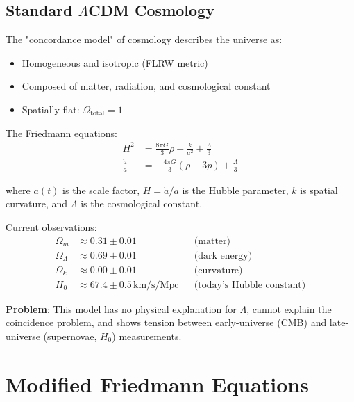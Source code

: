 \subsection{Standard \texorpdfstring{$\Lambda$}{Lambda}CDM Cosmology}

\begin{level2}
The "concordance model" of cosmology\cite{peebles2003,planck2018} describes the universe as:
\begin{itemize}
\item Homogeneous and isotropic (FLRW metric)
\item Composed of matter, radiation, and cosmological constant
\item Spatially flat: $\Omega_{\text{total}} = 1$
\end{itemize}

The Friedmann equations\cite{friedmann1922,lemaitre1927,robertson1935}:
\begin{align}
H^2 &= \frac{8\pi G}{3} \rho - \frac{k}{a^2} + \frac{\Lambda}{3} \label{eq:friedmann1-standard} \\
\frac{\ddot{a}}{a} &= -\frac{4\pi G}{3} (\rho + 3p) + \frac{\Lambda}{3} \label{eq:friedmann2-standard}
\end{align}

where $a(t)$ is the scale factor, $H = \dot{a}/a$ is the Hubble parameter, $k$ is spatial curvature, and $\Lambda$ is the cosmological constant.

Current observations\cite{planck2018}:
\begin{align}
\Omega_m &\approx 0.31 \pm 0.01 && \text{(matter)} \\
\Omega_\Lambda &\approx 0.69 \pm 0.01 && \text{(dark energy)} \\
\Omega_k &\approx 0.00 \pm 0.01 && \text{(curvature)} \\
H_0 &\approx 67.4 \pm 0.5 \, \text{km/s/Mpc} && \text{(today's Hubble constant)}
\end{align}

\textbf{Problem}: This model has no physical explanation for $\Lambda$, cannot explain the coincidence problem, and shows tension between early-universe (CMB) and late-universe (supernovae, $H_0$) measurements\cite{divalentino2021}.
\end{level2}

\section{Modified Friedmann Equations}

